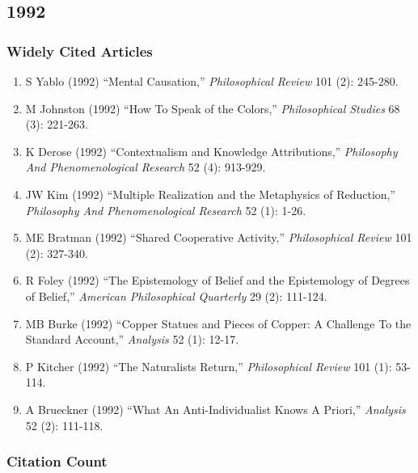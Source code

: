\documentclass[
  10pt,
  letterpaper,
  DIV=11,
  numbers=noendperiod,
  twoside]{scrartcl}
\providecommand{\tightlist}{%
  \setlength{\itemsep}{0pt}\setlength{\parskip}{0pt}}\usepackage{longtable,booktabs,array}
\begin{document}
\newpage

\subsection{1992}\label{sec-s1992}

\subsubsection*{Widely Cited Articles}\label{widely-cited-articles-36}

\begin{enumerate}
\def\labelenumi{\arabic{enumi}.}
\tightlist
\item
  S Yablo (1992) ``Mental Causation,'' \emph{Philosophical Review} 101
  (2): 245-280.
\item
  M Johnston (1992) ``How To Speak of the Colors,'' \emph{Philosophical
  Studies} 68 (3): 221-263.
\item
  K Derose (1992) ``Contextualism and Knowledge Attributions,''
  \emph{Philosophy And Phenomenological Research} 52 (4): 913-929.
\item
  JW Kim (1992) ``Multiple Realization and the Metaphysics of
  Reduction,'' \emph{Philosophy And Phenomenological Research} 52 (1):
  1-26.
\item
  ME Bratman (1992) ``Shared Cooperative Activity,'' \emph{Philosophical
  Review} 101 (2): 327-340.
\item
  R Foley (1992) ``The Epistemology of Belief and the Epistemology of
  Degrees of Belief,'' \emph{American Philosophical Quarterly} 29 (2):
  111-124.
\item
  MB Burke (1992) ``Copper Statues and Pieces of Copper: A Challenge To
  the Standard Account,'' \emph{Analysis} 52 (1): 12-17.
\item
  P Kitcher (1992) ``The Naturalists Return,'' \emph{Philosophical
  Review} 101 (1): 53-114.
\item
  A Brueckner (1992) ``What An Anti-Individualist Knows A Priori,''
  \emph{Analysis} 52 (2): 111-118.
\end{enumerate}

\subsubsection*{Citation Count}\label{sec-count-1992}
\end{document}
